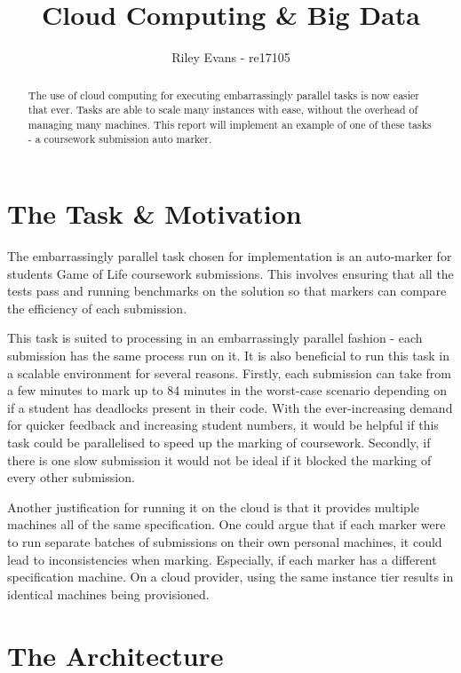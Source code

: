 \documentclass[runningheads]{llncs}
\begin{document}
\title{Cloud Computing \& Big Data}
\author{Riley Evans - re17105}
\maketitle 


\begin{abstract}
The use of cloud computing for executing embarrassingly parallel tasks is now easier that ever. Tasks are able to scale many instances with ease, without the overhead of managing many machines. This report will implement an example of one of these tasks - a coursework submission auto marker.
\end{abstract}

\section{The Task \& Motivation}
The embarrassingly parallel task chosen for implementation is an auto-marker for students Game of Life coursework submissions. This involves ensuring that all the tests pass and running benchmarks on the solution so that markers can compare the efficiency of each submission. 

This task is suited to processing in an embarrassingly parallel fashion - each submission has the same process run on it. It is also beneficial to run this task in a scalable environment for several reasons. Firstly, each submission can take from a few minutes to mark up to 84 minutes in the worst-case scenario depending on if a student has deadlocks present in their code. With the ever-increasing demand for quicker feedback and increasing student numbers, it would be helpful if this task could be parallelised to speed up the marking of coursework. Secondly, if there is one slow submission it would not be ideal if it blocked the marking of every other submission. 

Another justification for running it on the cloud is that it provides multiple machines all of the same specification. One could argue that if each marker were to run separate batches of submissions on their own personal machines, it could lead to inconsistencies when marking. Especially, if each marker has a different specification machine. On a cloud provider, using the same instance tier results in identical machines being provisioned.

\section{The Architecture}
\end{document}
